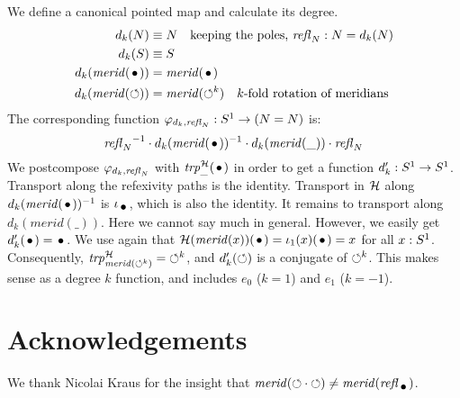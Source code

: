 \documentclass[english,a4]{article}
\newcommand{\mrd}{\mathit{merid}}%
\def\blank{\_}%
\begin{document}
\begin{example}\label{exa:degree-k-function}
We define a canonical pointed map and calculate its degree.
\begin{align}
  \label{eq:deg-k-func}
  d_k(N)&\jdeq N \quad\text{keeping the poles, $\refl{N}: N=d_k(N)$}\\
  d_k(S)&\jdeq S\\
  d_k(\mrd(\base))&= \mrd(\base)\\
  d_k(\mrd(\Sloop))&= \mrd(\Sloop^{k})\quad\text{$k$-fold rotation of meridians}
\end{align}
The corresponding function $\varphi_{d_k,\mathop{{\mathit{refl}}_{N}}}: {S^1} \to (N=N)$ is:
\[
{\refl{N}}^{-1} \cdot d_k(\mrd(\base))^{-1}\cdot d_k(\mrd(\blank))\cdot \refl{N}
\]
We postcompose $\varphi_{d_k,\mathop{{\mathit{refl}}_{N}}}$ with $\trp[\hopffam]{\blank}(\base)$
in order to get a function $d'_k :  {S^1} \to {S^1}$.
Transport along the refexivity paths is the identity. 
Transport in $\mathcal H$ along $d_k(\mrd(\base))^{-1}$ is $\iota_{\base}$,
which is also the identity. It remains to transport along $d_k(\mrd(\blank))$.
Here we cannot say much in general. 
However, we easily get $d'_k(\base)=\base$.
We use again that
$\hopffam(\mrd(x))(\base) = \iota_1(x)(\base) = x$ for all $x:{S^1}$.
Consequently, $\trp[\hopffam]{ \mrd(\Sloop^{k})} =  \Sloop^{k}$,
and $d'_k(\mathord{\circlearrowleft})$ is a conjugate of $\mathord{\circlearrowleft}^{k}$.
This makes sense as a degree $k$ function, 
and includes $e_0$ ($k=1$) and $e_1$ ($k=-1$).


\end{example}


\section*{Acknowledgements}
We thank Nicolai Kraus for the insight that
$\mrd(\Sloop\cdot\Sloop) \neq \mrd(\refl{\base})$.
\end{document}
